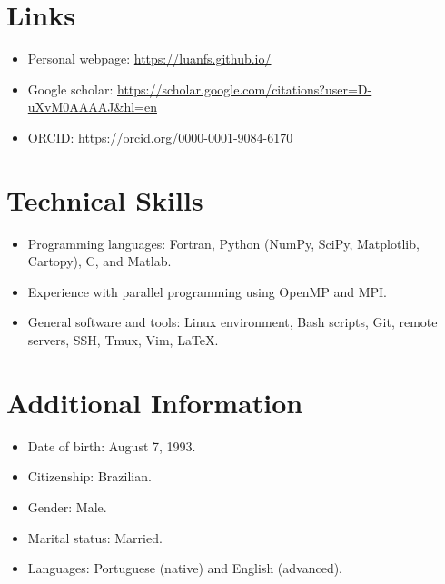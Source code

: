 \documentclass[letterpaper,11pt]{article}
\begin{document}
 
%
\section{Links}
\begin{itemize}
	\item Personal webpage:  \href{https://luanfs.github.io/}{https://luanfs.github.io/}
	\item Google scholar: \href{https://scholar.google.com/citations?user=D-uXvM0AAAAJ&hl=en}{https://scholar.google.com/citations?user=D-uXvM0AAAAJ\&hl=en}
	\item ORCID:  \href{https://orcid.org/0000-0001-9084-6170}{https://orcid.org/0000-0001-9084-6170}
\end{itemize}
 
%
\section{Technical Skills}
\begin{itemize}
	\item Programming languages: Fortran, Python (NumPy, SciPy, Matplotlib, Cartopy), C, and Matlab.
	\item Experience with parallel programming using OpenMP and MPI.
	\item General software and tools: Linux environment, Bash scripts, Git, remote servers, SSH, Tmux, Vim, \LaTeX.
\end{itemize}


\section{Additional Information}
\begin{itemize}
	\item Date of birth: August 7, 1993.
	\item Citizenship: Brazilian.
	\item Gender: Male.
	\item Marital status: Married.
	\item Languages: Portuguese (native) and English (advanced).
\end{itemize}




\end{document}
